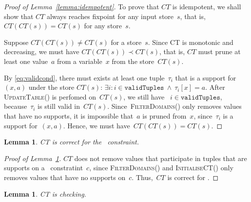 \documentclass[a4paper,11pt]{article}
\newtheorem{lemma}[theorem]{Lemma}
\newcommand{\Table}{\Constraint{Table}}
\newcommand{\Lemmaref}[1]{Lemma~\ref{#1}}
\newcommand{\Eqref}[1]{\eqref{#1}}
\newcommand{\CurrTable}{\texttt{validTuples}}
\def\UpdateTable{\textsc{UpdateTable}}
\def\FilterDomains{\textsc{FilterDomains}}
\def\InitialiseCT{\textsc{InitialiseCT}}
\numberwithin{equation}{section}
\begin{document}
\begin{proof}[Proof of \Lemmaref{lemma:idempotent}]
  To prove that $CT$ is idempotent, we shall show that $CT$ always reaches
  fixpoint for any input store~$s$, that is, $CT(CT(s)) = CT(s)$ for any
  store~$s$.

  Suppose $CT(CT(s)) \neq CT(s)$ for a store~$s$. 
  Since CT is monotonic
  and decreasing, we must have $CT(CT(s)) \prec CT(s)$, that is, $CT$
  must prune at least one value~$a$ from a variable~$x$ from the 
  store~$CT(s)$. 

  By \Eqref{eq:validcond}, there must exists at least one 
  tuple~$\tau_i$
  that is a support for~$(x,a)$ under the store $CT(s)$: 
  $\exists i: i \in \CurrTable \ \land \ \tau_i[x] = a$.
  After \UpdateTable() is perfomed on~$CT(s)$, we still have
  ~$i \in \CurrTable$, because~$\tau_i$ is still valid in~$CT(s)$.
  Since~\FilterDomains() only removes values that have no supports,
  it is impossible that~$a$ is pruned from~$x$, since~$\tau_i$ is a
  support for~$(x,a)$. Hence, we must have~$CT(CT(s)) = CT(s)$.
\end{proof}


\begin{lemma}\label{lemma:correct}
  CT is correct for the \Table~constraint.
\end{lemma}

\begin{proof}[Proof of \Lemmaref{lemma:correct}]
  $CT$ does not remove values that participate in tuples that are supports
  on a \Table~constratint~$c$,
  since \FilterDomains() and \InitialiseCT() only removes values that 
  have no supports on~$c$. Thus,~$CT$ is correct for \Table.
\end{proof}

\begin{lemma}\label{lemma:checking}
  CT is checking.
\end{lemma}
\end{document}
